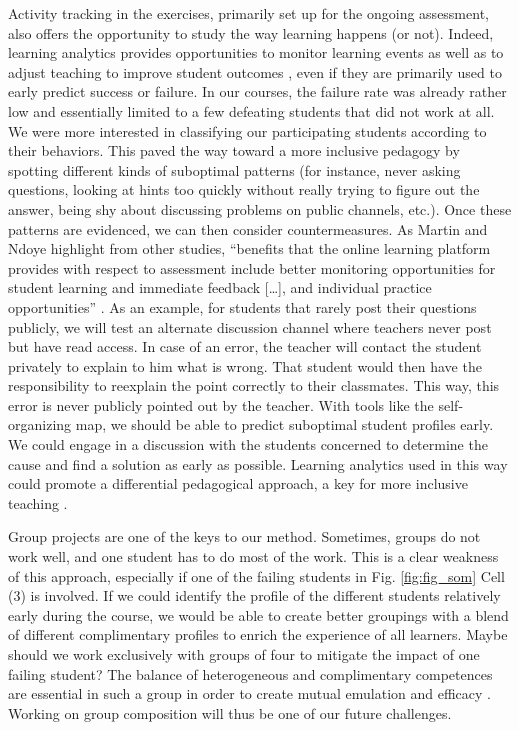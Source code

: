 \documentclass{aims} %
\theoremstyle{definition}
\begin{document}
Activity tracking in the exercises, primarily set up for the ongoing
assessment, also offers the opportunity to study the way learning
happens (or not). Indeed, learning analytics provides opportunities to
monitor learning events as well as to adjust teaching to improve student
outcomes \cite{Martin2016, Romero2020}, even if they are primarily used
to early predict success or failure. In our courses, the failure rate
was already rather low and essentially limited to a few defeating
students that did not work at all. We were more interested in
classifying our participating students according to their behaviors.
This paved the way toward a more inclusive pedagogy by spotting
different kinds of suboptimal patterns (for instance, never asking
questions, looking at hints too quickly without really trying to figure
out the answer, being shy about discussing problems on public channels,
etc.). Once these patterns are evidenced, we can then consider
countermeasures. As Martin and Ndoye highlight from other studies,
``benefits that the online learning platform provides with respect to
assessment include better monitoring opportunities for student learning
and immediate feedback {[}\ldots{]}, and individual practice
opportunities'' \cite{Martin2016}. As an example, for students that
rarely post their questions publicly, we will test an alternate
discussion channel where teachers never post but have read access. In
case of an error, the teacher will contact the student privately to
explain to him what is wrong. That student would then have the
responsibility to reexplain the point correctly to their classmates.
This way, this error is never publicly pointed out by the teacher. With
tools like the self-organizing map, we should be able to predict
suboptimal student profiles early. We could engage in a discussion with
the students concerned to determine the cause and find a solution as
early as possible. Learning analytics used in this way could promote a
differential pedagogical approach, a key for more inclusive teaching
\cite{Siemens2013}.

Group projects are one of the keys to our method. Sometimes, groups do
not work well, and one student has to do most of the work. This is a
clear weakness of this approach, especially if one of the failing
students in Fig. \ref {fig:fig_som} Cell (3) is involved. If we could
identify the profile of the different students relatively early during
the course, we would be able to create better groupings with a blend of
different complimentary profiles to enrich the experience of all
learners. Maybe should we work exclusively with groups of four to
mitigate the impact of one failing student? The balance of heterogeneous
and complimentary competences are essential in such a group in order to
create mutual emulation and efficacy \cite{Mucchielli1996}. Working on
group composition will thus be one of our future challenges.
\end{document}
